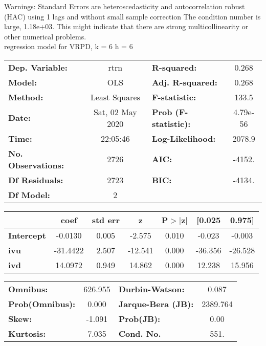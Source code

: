 Warnings: \newline
 [1] Standard Errors are heteroscedasticity and autocorrelation robust (HAC) using 1 lags and without small sample correction \newline
 [2] The condition number is large, 1.18e+03. This might indicate that there are \newline
 strong multicollinearity or other numerical problems.\\ 

regression model for VRPD, k = 6 h = 6\begin{center}
\begin{tabular}{lclc}
\toprule
\textbf{Dep. Variable:}    &       rtrn       & \textbf{  R-squared:         } &     0.268   \\
\textbf{Model:}            &       OLS        & \textbf{  Adj. R-squared:    } &     0.268   \\
\textbf{Method:}           &  Least Squares   & \textbf{  F-statistic:       } &     133.5   \\
\textbf{Date:}             & Sat, 02 May 2020 & \textbf{  Prob (F-statistic):} &  4.79e-56   \\
\textbf{Time:}             &     22:05:46     & \textbf{  Log-Likelihood:    } &    2078.9   \\
\textbf{No. Observations:} &        2726      & \textbf{  AIC:               } &    -4152.   \\
\textbf{Df Residuals:}     &        2723      & \textbf{  BIC:               } &    -4134.   \\
\textbf{Df Model:}         &           2      & \textbf{                     } &             \\
\bottomrule
\end{tabular}
\begin{tabular}{lcccccc}
                   & \textbf{coef} & \textbf{std err} & \textbf{z} & \textbf{P$> |$z$|$} & \textbf{[0.025} & \textbf{0.975]}  \\
\midrule
\textbf{Intercept} &      -0.0130  &        0.005     &    -2.575  &         0.010        &       -0.023    &       -0.003     \\
\textbf{ivu}       &     -31.4422  &        2.507     &   -12.541  &         0.000        &      -36.356    &      -26.528     \\
\textbf{ivd}       &      14.0972  &        0.949     &    14.862  &         0.000        &       12.238    &       15.956     \\
\bottomrule
\end{tabular}
\begin{tabular}{lclc}
\textbf{Omnibus:}       & 626.955 & \textbf{  Durbin-Watson:     } &    0.087  \\
\textbf{Prob(Omnibus):} &   0.000 & \textbf{  Jarque-Bera (JB):  } & 2389.764  \\
\textbf{Skew:}          &  -1.091 & \textbf{  Prob(JB):          } &     0.00  \\
\textbf{Kurtosis:}      &   7.035 & \textbf{  Cond. No.          } &     551.  \\
\bottomrule
\end{tabular}
\end{center}

